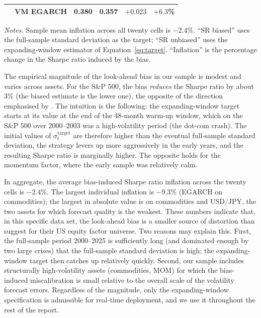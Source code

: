 \documentclass[12pt, a4paper]{article}
\newcommand{\stgt}{\sigma^{\mathrm{target}}}
\begin{document}
\begin{table}[H]
\begin{tabular}{llcccc}
      & VM EGARCH   & 0.380 & 0.357 & $+0.023$ & $+6.3$\% \\
    \bottomrule
  \end{tabular}
  \begin{minipage}{0.95\textwidth}
    \vspace{2pt}
    \footnotesize\textit{Notes.} Sample mean inflation across all twenty cells is
    $-2.4$\%. ``SR biased'' uses the full-sample standard deviation as the target;
    ``SR unbiased'' uses the expanding-window estimator of Equation~\eqref{eq:target}.
    ``Inflation'' is the percentage change in the Sharpe ratio induced by the bias.
  \end{minipage}
\end{table}

\noindent
The empirical magnitude of the look-ahead bias in our sample is modest and varies
across assets. For the S\&P 500, the bias \emph{reduces} the Sharpe ratio by about 3\%
(the biased estimate is the lower one), the opposite of the direction emphasised by
\citet{Liu2019}. The intuition is the following: the expanding-window target starts at
its value at the end of the 48-month warm-up window, which on the S\&P 500 over
2000--2003 was a high-volatility period (the dot-com crash). The initial values of
$\stgt_t$ are therefore higher than the eventual full-sample standard deviation, the
strategy levers up more aggressively in the early years, and the resulting Sharpe ratio
is marginally higher. The opposite holds for the momentum factor, where the early
sample was relatively calm.

In aggregate, the average bias-induced Sharpe ratio inflation across the twenty cells is
$-2.4$\%. The largest individual inflation is $-9.3$\% (EGARCH on commodities); the
largest in absolute value is on commodities and USD/JPY, the two assets for which
forecast quality is the weakest. These numbers indicate that, in this specific data set,
the look-ahead bias is a smaller source of distortion than \citet{Liu2019} suggest for
their US equity factor universe. Two reasons may explain this. First, the full-sample
period 2000--2025 is sufficiently long (and dominated enough by two large crises) that
the full-sample standard deviation is high; the expanding-window target then catches up
relatively quickly. Second, our sample includes structurally high-volatility assets
(commodities, MOM) for which the bias-induced miscalibration is small relative to the
overall scale of the volatility forecast errors. Regardless of the magnitude, only the
expanding-window specification is admissible for real-time deployment, and we use it
throughout the rest of the report.
\end{document}
